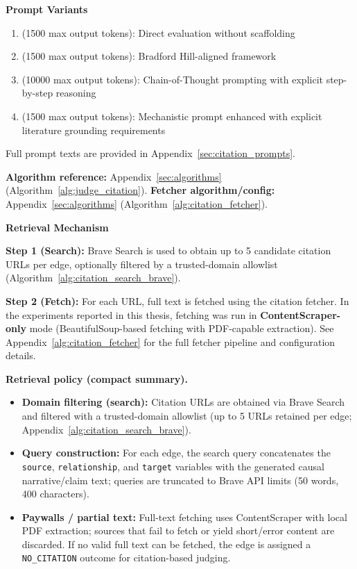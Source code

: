 \noindent\textbf{Prompt Variants}
\begin{enumerate}[noitemsep]
    \item \textbf{\PromptBaseline} (1500 max output tokens): Direct evaluation without scaffolding
    \item \textbf{\PromptMechanistic} (1500 max output tokens): Bradford Hill-aligned framework
    \item \textbf{\PromptCoT} (10000 max output tokens): Chain-of-Thought prompting with explicit step-by-step reasoning
    \item \textbf{\PromptMechanisticLit} (1500 max output tokens): Mechanistic prompt enhanced with explicit literature grounding requirements
\end{enumerate}
Full prompt texts are provided in Appendix~\ref{sec:citation_prompts}.

\textbf{Algorithm reference:} Appendix~\ref{sec:algorithms} (Algorithm~\ref{alg:judge_citation}). \textbf{Fetcher algorithm/config:} Appendix~\ref{sec:algorithms} (Algorithm~\ref{alg:citation_fetcher}).

\noindent\textbf{Retrieval Mechanism}

\textbf{Step 1 (Search):} Brave Search is used to obtain up to 5 candidate citation URLs per edge, optionally filtered by a trusted-domain allowlist (Algorithm~\ref{alg:citation_search_brave}).

\textbf{Step 2 (Fetch):} For each URL, full text is fetched using the citation fetcher. In the experiments reported in this thesis, fetching was run in \textbf{ContentScraper-only} mode (BeautifulSoup-based fetching with PDF-capable extraction). See Appendix~\ref{alg:citation_fetcher} for the full fetcher pipeline and configuration details.

\textbf{Retrieval policy (compact summary).}
\begin{itemize}[noitemsep]
    \item \textbf{Domain filtering (search):} Citation URLs are obtained via Brave Search and filtered with a trusted-domain allowlist (up to 5 URLs retained per edge; Appendix~\ref{alg:citation_search_brave}).
    \item \textbf{Query construction:} For each edge, the search query concatenates the \texttt{source}, \texttt{relationship}, and \texttt{target} variables with the generated causal narrative/claim text; queries are truncated to Brave API limits (50 words, 400 characters).
    \item \textbf{Paywalls / partial text:} Full-text fetching uses ContentScraper with local PDF extraction; sources that fail to fetch or yield short/error content are discarded. If no valid full text can be fetched, the edge is assigned a \texttt{NO\_CITATION} outcome for citation-based judging.
\end{itemize}

